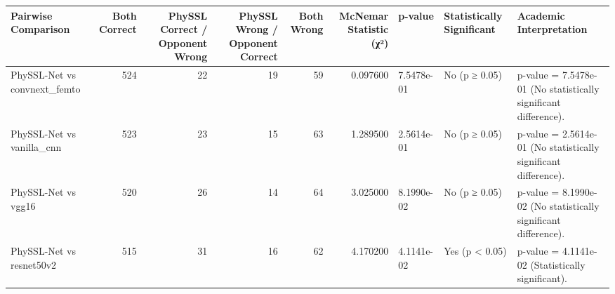 \begin{tabular}{lrrrrrlll}
\toprule
Pairwise Comparison & Both Correct & PhySSL Correct / Opponent Wrong & PhySSL Wrong / Opponent Correct & Both Wrong & McNemar Statistic (χ²) & p-value & Statistically Significant & Academic Interpretation \\
\midrule
PhySSL-Net vs convnext_femto & 524 & 22 & 19 & 59 & 0.097600 & 7.5478e-01 & No (p ≥ 0.05) & p-value = 7.5478e-01 (No statistically significant difference). \\
PhySSL-Net vs vanilla_cnn & 523 & 23 & 15 & 63 & 1.289500 & 2.5614e-01 & No (p ≥ 0.05) & p-value = 2.5614e-01 (No statistically significant difference). \\
PhySSL-Net vs vgg16 & 520 & 26 & 14 & 64 & 3.025000 & 8.1990e-02 & No (p ≥ 0.05) & p-value = 8.1990e-02 (No statistically significant difference). \\
PhySSL-Net vs resnet50v2 & 515 & 31 & 16 & 62 & 4.170200 & 4.1141e-02 & Yes (p < 0.05) & p-value = 4.1141e-02 (Statistically significant). \\
\bottomrule
\end{tabular}
